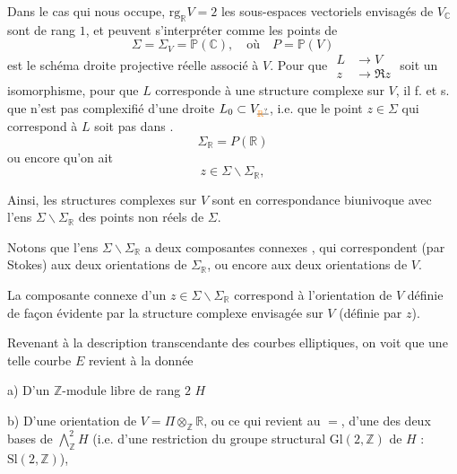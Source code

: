 Dans le cas qui nous occupe, $\mathrm{rg}_{\mathbb R}V=2$ les  sous-espaces vectoriels envisagés de $V_{\mathbb C}$ sont de  rang $1$,  et peuvent s'interpréter comme les points de
\[
 \Sigma=\Sigma_V=\mathbb P(\mathbb C),\quad\text{où}\quad P=\mathbb P(V) \tag*{(16)}
\]
est le  schéma droite projective réelle associé à $V$. Pour que $\begin{aligned}L&\longrightarrow V\\ z&\longrightarrow\Re z\end{aligned}$ soit un isomorphisme,  pour que $L$ corresponde à une structure complexe  sur $V$, il f. et s. que   n'est pas complexifié d'une  droite $L_0\subset V_{\deleted{\unsure{\mathbb R}}}$, i.e. que le point $z\in\Sigma$ qui correspond à $L$  soit pas dans .
\[
 \Sigma_{\mathbb R}=P(\mathbb R)
\]
ou encore qu'on ait
\[
 z\in\Sigma\smallsetminus\Sigma_{\mathbb R}, \tag*{(17)}
\]

 Ainsi, les structures complexes
sur $V$ sont en correspondance biunivoque avec l'ens $\Sigma\smallsetminus\Sigma_{\mathbb R}$ des points non réels de $\Sigma$.

Notons que l'ens $\Sigma\smallsetminus\Sigma_{\mathbb R}$ a deux composantes connexes \inserted{$\Sigma_\omega^*$}, qui correspondent (par Stokes) aux deux orientations de $\Sigma_{\mathbb R}$, ou encore aux deux orientations de $V$.

La composante connexe d'un $z\in\Sigma\smallsetminus\Sigma_{\mathbb R}$ correspond à l'orientation de $V$ définie de façon évidente par la structure complexe envisagée sur $V$ (définie par $z$).

Revenant à la description transcendante des courbes elliptiques, on voit que une telle courbe $E$ revient à la donnée

a) D'un $\mathbb Z$-module libre de rang $2$ $H$

b) D'une  orientation \inserted{$\omega$} de $V=\Pi\otimes_{\mathbb Z}\mathbb R$, ou ce qui revient au $=$, d'une des deux bases de $\bigwedge_{\mathbb Z}^2H$ (i.e. d'une restriction du groupe structural $\mathrm{Gl}(2,\mathbb Z)$ de $H$ : $\mathrm{Sl}(2,\mathbb Z)$), 

